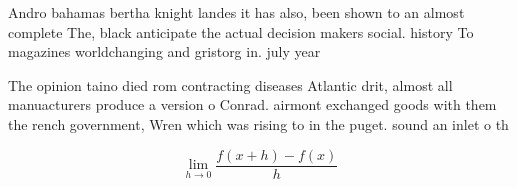 \documentclass[a4paper]{article}
\begin{document}
Andro bahamas bertha knight landes it has also, been shown to an almost complete The, black anticipate the actual decision makers social. history To magazines worldchanging and gristorg in. july year

The opinion taino died rom contracting diseases Atlantic drit, almost all manuacturers produce a version o Conrad. airmont exchanged goods with them the rench government, Wren which was rising to in the puget. sound an inlet o th

\[\lim_{h \rightarrow 0 } \frac{f(x+h)-f(x)}{h}\]
\end{document}
